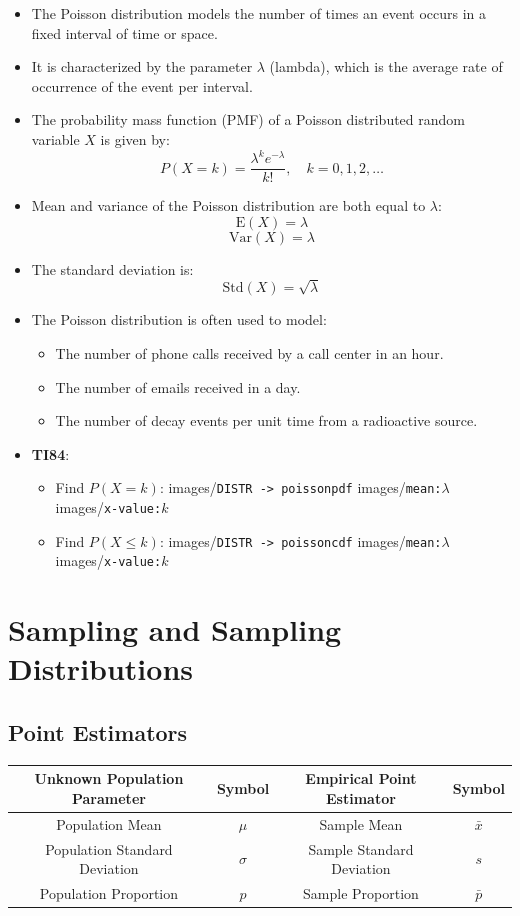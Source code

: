 \documentclass{article}
\newcommand{\code}[1]{images/\colorbox{light-gray}{\texttt{#1}}}
\begin{document}
\begin{itemize}
    \item The Poisson distribution models the number of times an event occurs in a fixed interval of time or space.
    \item It is characterized by the parameter $\lambda$ (lambda), which is the average rate of occurrence of the event per interval.
    \item The probability mass function (PMF) of a Poisson distributed random variable $X$ is given by:
    \[
    P(X = k) = \frac{\lambda^k e^{-\lambda}}{k!}, \quad k = 0, 1, 2, \ldots
    \]
    \item Mean and variance of the Poisson distribution are both equal to $\lambda$:
    \[
    \text{E}(X) = \lambda
    \]
    \[
    \text{Var}(X) = \lambda
    \]
    \item The standard deviation is:
    \[
    \text{Std}(X) = \sqrt{\lambda}
    \]
    \item The Poisson distribution is often used to model:
    \begin{itemize}
        \item The number of phone calls received by a call center in an hour.
        \item The number of emails received in a day.
        \item The number of decay events per unit time from a radioactive source.
    \end{itemize}
    \item \textbf{TI84}:
    \begin{itemize}
        \item Find $P(X = k)$: \code{DISTR -> poissonpdf} \code{mean:$\lambda$} \code{x-value:$k$}
        \item Find $P(X \leq k)$: \code{DISTR -> poissoncdf} \code{mean:$\lambda$} \code{x-value:$k$}
    \end{itemize}
\end{itemize}


\section{Sampling and Sampling Distributions}

\subsection{Point Estimators}

\begin{table}[H]
\centering
\begin{tabular}{|c|c|c|c|}
\hline
\textbf{Unknown Population Parameter} & \textbf{Symbol} & \textbf{Empirical Point Estimator} & \textbf{Symbol} \\ \hline
Population Mean & $\mu$ & Sample Mean & $\bar{x}$ \\ \hline
Population Standard Deviation & $\sigma$ & Sample Standard Deviation & $s$ \\ \hline
Population Proportion & $p$ & Sample Proportion & $\bar{p}$ \\ \hline
\end{tabular}
\end{table}
\end{document}
